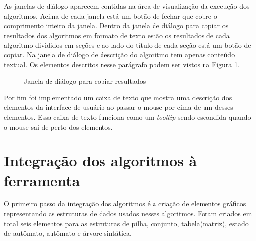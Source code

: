As janelas de diálogo aparecem contidas na área de visualização da execução dos algoritmos. Acima de cada janela está um botão de fechar que cobre o comprimento inteiro da janela. Dentro da janela de diálogo para copiar os resultados dos algoritmos em formato de texto estão os resultados de cada algoritmo divididos em seções e ao lado do título de cada seção está um botão de copiar. Na janela de diálogo de descrição do algoritmo tem apenas conteúdo textual. Os elementos descritos nesse parágrafo podem ser vistos na Figura \ref{fig:mpopup}.

\begin{figure}[ht]
  \centering
  \captionsetup{width=16cm}
  \caption{Janela de diálogo para copiar resultados}
  \label{fig:mpopup}
\end{figure}

Por fim foi implementado um caixa de texto que mostra uma descrição dos elementos da interface de usuário ao passar o mouse por cima de um desses elementos. Essa caixa de texto funciona como um \textit{tooltip} sendo escondida quando o mouse sai de perto dos elementos.

\section{Integração dos algoritmos à ferramenta}
O primeiro passo da integração dos algoritmos é a criação de elementos gráficos representando as estruturas de dados usados nesses algoritmos. Foram criados em total seis elementos para as estruturas de pilha, conjunto, tabela(matriz), estado de autômato, autômato e árvore sintática.

